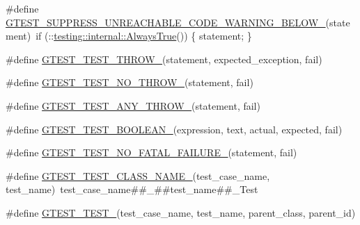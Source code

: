 \begin{DoxyCompactItemize}
\#define \hyperlink{gtest-internal_8h_a2e66f7dfc5cb87e0fa0289f653173c69}{G\+T\+E\+S\+T\+\_\+\+S\+U\+P\+P\+R\+E\+S\+S\+\_\+\+U\+N\+R\+E\+A\+C\+H\+A\+B\+L\+E\+\_\+\+C\+O\+D\+E\+\_\+\+W\+A\+R\+N\+I\+N\+G\+\_\+\+B\+E\+L\+O\+W\+\_\+}(statement)~if (\+::\hyperlink{namespacetesting_1_1internal_a922c9da63cd4bf94fc473b9ecac76414}{testing\+::internal\+::\+Always\+True}()) \{ statement; \}
\item 
\#define \hyperlink{gtest-internal_8h_a3f71db93eaf30b0cfca9612b9ac32106}{G\+T\+E\+S\+T\+\_\+\+T\+E\+S\+T\+\_\+\+T\+H\+R\+O\+W\+\_\+}(statement,  expected\+\_\+exception,  fail)
\item 
\#define \hyperlink{gtest-internal_8h_a9a109d026b5a904646437d7570e13581}{G\+T\+E\+S\+T\+\_\+\+T\+E\+S\+T\+\_\+\+N\+O\+\_\+\+T\+H\+R\+O\+W\+\_\+}(statement,  fail)
\item 
\#define \hyperlink{gtest-internal_8h_af48bbd26d54d4afc5e4cef39b1c76ba3}{G\+T\+E\+S\+T\+\_\+\+T\+E\+S\+T\+\_\+\+A\+N\+Y\+\_\+\+T\+H\+R\+O\+W\+\_\+}(statement,  fail)
\item 
\#define \hyperlink{gtest-internal_8h_ae8912365e1d00a7a2bd248268c64aa1a}{G\+T\+E\+S\+T\+\_\+\+T\+E\+S\+T\+\_\+\+B\+O\+O\+L\+E\+A\+N\+\_\+}(expression,  text,  actual,  expected,  fail)
\item 
\#define \hyperlink{gtest-internal_8h_a1b37a3c446836d33040f3266a6236081}{G\+T\+E\+S\+T\+\_\+\+T\+E\+S\+T\+\_\+\+N\+O\+\_\+\+F\+A\+T\+A\+L\+\_\+\+F\+A\+I\+L\+U\+R\+E\+\_\+}(statement,  fail)
\item 
\#define \hyperlink{gtest-internal_8h_a87a1ee3a3b9b798195236d053f2e5dcc}{G\+T\+E\+S\+T\+\_\+\+T\+E\+S\+T\+\_\+\+C\+L\+A\+S\+S\+\_\+\+N\+A\+M\+E\+\_\+}(test\+\_\+case\+\_\+name,  test\+\_\+name)~test\+\_\+case\+\_\+name\#\#\+\_\+\#\#test\+\_\+name\#\#\+\_\+\+Test
\item 
\#define \hyperlink{gtest-internal_8h_ae2d26f0f92fbaf62bf4c1eca45bb2f1f}{G\+T\+E\+S\+T\+\_\+\+T\+E\+S\+T\+\_\+}(test\+\_\+case\+\_\+name,  test\+\_\+name,  parent\+\_\+class,  parent\+\_\+id)
\end{DoxyCompactItemize}
